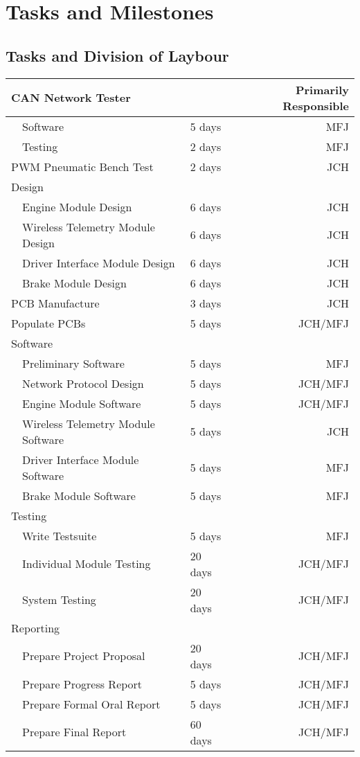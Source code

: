 %
%
%
%

\chapter{Tasks and Milestones}

\section{Tasks and Division of Laybour}

\begin{center}
  \begin{tabular}{|l|l|l|r|}
  \hline 
  \multicolumn{3}{|l|}{CAN Network Tester} & Primarily Responsible\\
  \hline 
  & Software & 5 days & MFJ\\
  & Testing & 2 days & MFJ\\
  \hline 
  \multicolumn{2}{|l|}{PWM Pneumatic Bench Test} & 2 days & JCH\\
  \hline 
  \multicolumn{3}{|l|}{Design} &\\
  \hline 
  & Engine Module Design & 6 days & JCH\\
  & Wireless Telemetry Module Design & 6 days & JCH\\
  & Driver Interface Module Design & 6 days & JCH\\
  & Brake Module Design & 6 days & JCH\\
  \hline 
  \multicolumn{2}{|l|}{PCB Manufacture} & 3 days & JCH\\
  \hline 
  \multicolumn{2}{|l|}{Populate PCBs} & 5 days & JCH/MFJ\\
  \hline 
  \multicolumn{3}{|l|}{Software} &\\
  \hline 
  & Preliminary Software & 5 days & MFJ\\
  & Network Protocol Design & 5 days & JCH/MFJ\\
  & Engine Module Software & 5 days & JCH/MFJ\\
  & Wireless Telemetry Module Software & 5 days & JCH\\
  & Driver Interface Module Software & 5 days & MFJ\\
  & Brake Module Software & 5 days & MFJ\\
  \hline 
  \multicolumn{3}{|l|}{Testing} &\\
  \hline 
  & Write Testsuite & 5 days & MFJ\\
  & Individual Module Testing & 20 days & JCH/MFJ\\
  & System Testing & 20 days & JCH/MFJ\\
  \hline
  \multicolumn{3}{|l|}{Reporting} &\\
  \hline
  & Prepare Project Proposal & 20 days & JCH/MFJ\\
  & Prepare Progress Report & 5 days & JCH/MFJ\\
  & Prepare Formal Oral Report & 5 days & JCH/MFJ\\
  & Prepare Final Report & 60 days & JCH/MFJ\\
  \hline
  \end{tabular}
\end{center}

